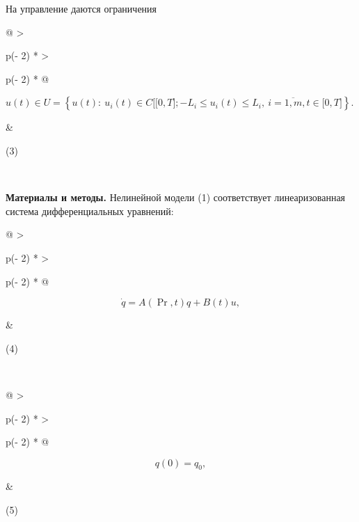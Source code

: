 На управление даются ограничения

\begin{longtable}[]{@{}
  >{\raggedright\arraybackslash}p{(\columnwidth - 2\tabcolsep) * }
  >{\raggedright\arraybackslash}p{(\columnwidth - 2\tabcolsep) * }@{}}
\toprule\noalign{}
\begin{minipage}[b]{\linewidth}\raggedright
\(u(t) \in U = \left\{ u(t):\ u_{i}(t) \in C\lbrack\lbrack 0,T\rbrack; - L_{i} \leq u_{i}(t) \leq L_{i},\ i = \overline{1,m},t \in \lbrack 0,T\rbrack \right\}.\)
\end{minipage} & \begin{minipage}[b]{\linewidth}\raggedright
(3)
\end{minipage} \\
\midrule\noalign{}
\endhead
\bottomrule\noalign{}
\endlastfoot
\end{longtable}

{\bfseries Материалы и методы.} Нелинейной модели (1) соответствует
линеаризованная система дифференциальных уравнений:

\begin{longtable}[]{@{}
  >{\raggedright\arraybackslash}p{(\columnwidth - 2\tabcolsep) * }
  >{\raggedright\arraybackslash}p{(\columnwidth - 2\tabcolsep) * }@{}}
\toprule\noalign{}
\begin{minipage}[b]{\linewidth}\raggedright
\[\dot{q} = A\left( \Pr,t \right)q + B(t)u,\]
\end{minipage} & \begin{minipage}[b]{\linewidth}\raggedright
(4)
\end{minipage} \\
\midrule\noalign{}
\endhead
\bottomrule\noalign{}
\endlastfoot
\end{longtable}

\begin{longtable}[]{@{}
  >{\raggedright\arraybackslash}p{(\columnwidth - 2\tabcolsep) * }
  >{\raggedright\arraybackslash}p{(\columnwidth - 2\tabcolsep) * }@{}}
\toprule\noalign{}
\begin{minipage}[b]{\linewidth}\raggedright
\[q(0) = q_{0},\]
\end{minipage} & \begin{minipage}[b]{\linewidth}\raggedright
(5)
\end{minipage} \\
\midrule\noalign{}
\endhead
\bottomrule\noalign{}
\endlastfoot
\end{longtable}

